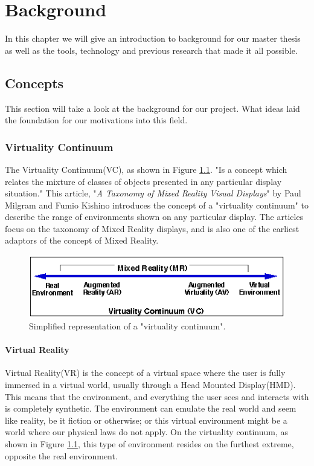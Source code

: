\chapter{Background}
\label{chap:background}
In this chapter we will give an introduction to background for our master thesis as well as the tools, technology and previous research that made it all possible. 

\section{Concepts}
    This section will take a look at the background for our project. What ideas laid the foundation for our motivations into this field.
    
    \subsection{Virtuality Continuum}
    The Virtuality Continuum(VC), as shown in Figure \ref{fig:virtualcontinuum}. "Is a concept which relates the mixture of classes of objects presented in any particular display situation."\cite{Milgram1994} This article, "\emph{A Taxonomy of Mixed Reality Visual Displays}" by Paul Milgram and Fumio Kishino\cite{Milgram1994} introduces the concept of a "virtuality continuum" to describe the range of environments shown on any particular display. The articles focus on the taxonomy of Mixed Reality displays, and is also one of the earliest adaptors of the concept of Mixed Reality.
    \begin{figure}[h!]
        \centering
        \includegraphics[scale=1]{figures/virtualcontinuum.png}
        \caption{Simplified representation of a "virtuality continuum".\cite{Milgram1994}}
        \label{fig:virtualcontinuum}
    \end{figure}
    
    \subsubsection{Virtual Reality}
    Virtual Reality(VR) is the concept of a virtual space where the user is fully immersed in a virtual world, usually through a Head Mounted Display(HMD). This means that the environment, and everything the user sees and interacts with is completely synthetic. The environment can emulate the real world and seem like reality, be it fiction or otherwise; or this virtual environment might be a world where our physical laws do not apply. On the virtuality continuum, as shown in Figure \ref{fig:virtualcontinuum}, this type of environment resides on the furthest extreme, opposite the real environment.

